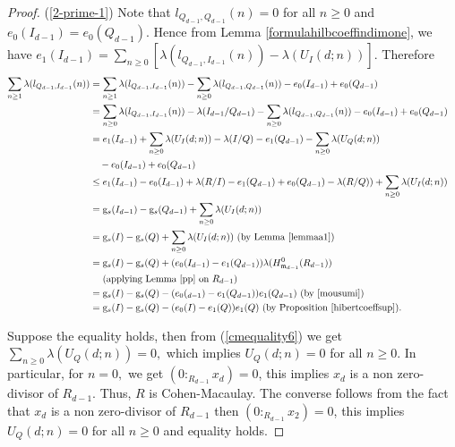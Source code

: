 \documentclass[reqno,a4paper,dvipsnames]{amsart}
\newcommand{\m}{\mathfrak{m} }
\theoremstyle{definition}
\begin{document}
\begin{proof}  
(\ref{2-prime-1}) Note that $l_{Q_{d-1},Q_{d-1}}(n) = 0$ for all $n \geq 0$ and $e_0(I_{d-1}) = e_0(Q_{d-1})$. Hence  from Lemma \ref{formulahilbcoeffindimone}, we have $e_{1}(I_{d-1})=\displaystyle\sum_{n \geq 0}[\lambda(l_{Q_{d-1},I_{d-1}}(n))-\lambda(U_{I}(d;n))]$. Therefore
\begin{align} \nonumber \label{cmequality6} \nonumber
    \sum_{n \geq 1} \lambda (l_{Q_{d-1},I_{d-1}}(n))
&=\sum_{n \geq 1} \lambda (l_{Q_{d-1},I_{d-1}}(n)) 
- \sum_{n \geq 0} \lambda (l_{Q_{d-1},Q_{d-1}}(n)) -e_{0}(I_{d-1})+e_{0}(Q_{d-1})  \\ \nonumber
&=\sum_{n \geq 0} \lambda (l_{Q_{d-1},I_{d-1}}(n)) - \lambda(I_{d-1}/Q_{d-1}) 
- \sum_{n \geq 0} \lambda (l_{Q_{d-1},Q_{d-1}}(n)) -e_{0}(I_{d-1})+e_{0}(Q_{d-1}) \\ \nonumber
  &=e_{1}(I_{d-1})+\sum_{n\geq 0}\lambda(U_{I}(d;n))-\lambda(I/Q)-e_{1}(Q_{d-1})-\sum_{n\geq 0}\lambda(U_{Q}(d;n))\\ \nonumber
  & \quad -e_{0}(I_{d-1})+e_{0}(Q_{d-1})  \\ 
 &\leq e_{1}(I_{d-1})-e_{0}(I_{d-1})+\lambda(R/I)-e_{1}(Q_{d-1})+e_{0}(Q_{d-1}) -\lambda(R/Q))+\sum_{n\geq 0}\lambda(U_{I}(d;n))  \\ \nonumber
    &= \mathrm{g}_{s}(I_{d-1})-\mathrm{g}_{s}(Q_{d-1})+\sum_{n\geq 0}\lambda(U_{I}(d;n))&\\ \nonumber
    &= \mathrm{g}_{s}(I)-\mathrm{g}_{s}(Q)+\sum_{n\geq 0}\lambda(U_{I}(d;n))   \text{ (by Lemma \ref{lemmaa1})}\\ \nonumber
    &=\mathrm{g}_{s}(I)-\mathrm{g}_{s}(Q)+(e_{0}(I_{d-1})
    -e_{1}(Q_{d-1}))\lambda(H^{0}_{\m_{d-1}}(R_{d-1})) \\ \nonumber 
    & \quad \text{ (applying Lemma \ref{pp} on $R_{d-1}$)}\\ \nonumber
    & =\mathrm{g}_{s}(I)-\mathrm{g}_{s}(Q)-(e_{0}(_{d-1})-e_{1}(Q_{d-1}))e_{1}(Q_{d-1}) 
    \mbox { (by \cite[Proposition 3.1]{mousumi})}\\  \nonumber
     & = \mathrm{g}_{s}(I)-\mathrm{g}_{s}(Q)-(e_{0}(I)-e_{1}(Q))e_{1}(Q)  
     \mbox{\text{ (by Proposition \ref{hibertcoeffsup})}}.
\end{align}

\normalsize
Suppose the equality holds, then from (\ref{cmequality6}) we get $\displaystyle \sum_{n \geq 0}\lambda(U_{Q}(d;n))=0,$ which implies $U_{Q}(d;n)=0$ for all $n \geq 0.$  In particular, for $n=0,$ we get $(0:_{R_{d-1}}x_{d})=0$, this implies $x_{d}$ is a non zero-divisor of $R_{d-1}$. Thus, $R$ is Cohen-Macaulay. The converse follows  from the fact that $x_{d}$ is a non zero-divisor of $R_{d-1}$ then $(0:_{R_{d-1}}x_{2})=0$, this implies   $U_{Q}(d;n)=0$ for all $n \geq 0$ and equality holds.


\end{proof}
\end{document}
